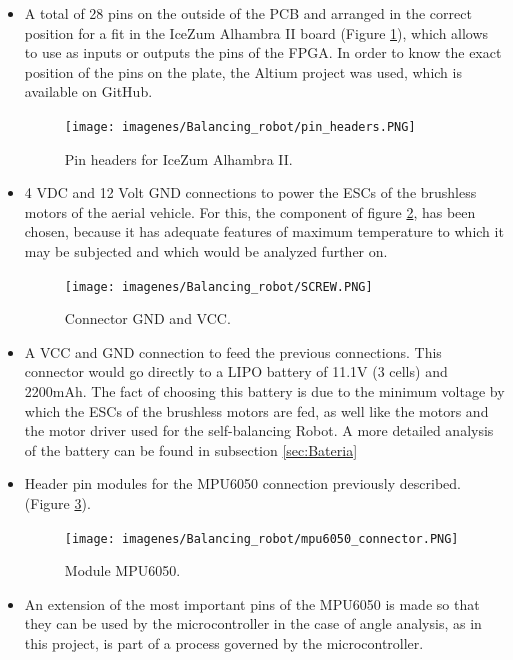 \begin{itemize}
	\item A total of 28 pins on the outside of the PCB and arranged in the correct position for a fit in the IceZum Alhambra II board (Figure \ref{fig:pin_headers}), which allows to use as inputs or outputs the pins of the FPGA. In order to know the exact position of the pins on the plate, the Altium project was used, which is available on GitHub.
	
	\begin{figure}[H]
		\center
		\texttt{[image: imagenes/Balancing\_robot/pin\_headers.PNG]}
		\caption{Pin headers for IceZum Alhambra II.}
		\label{fig:pin_headers}
	\end{figure}
	
	
	\item 4 VDC and 12 Volt GND connections to power the ESCs of the brushless motors of the aerial vehicle. For this, the component of figure \ref{fig:screw}, has been chosen, because it has adequate features of maximum temperature to which it may be subjected and which would be analyzed further on.
	
	\begin{figure}[H]
		\center
		\texttt{[image: imagenes/Balancing\_robot/SCREW.PNG]}
		\caption{Connector GND and VCC.}
		\label{fig:screw}
	\end{figure}
	
	
	\item A VCC and GND connection to feed the previous connections. This connector would go directly to a LIPO battery of 11.1V (3 cells) and 2200mAh. The fact of choosing this battery is due to the minimum voltage by which the ESCs of the brushless motors are fed, as well like the motors and the motor driver used for the self-balancing Robot. A more detailed analysis of the battery can be found in subsection \ref{sec:Bateria}
	
	\item Header pin modules for the MPU6050 connection previously described. (Figure \ref{fig:mpu6050_connector}).
		
		\begin{figure}[H]
			\center
			\texttt{[image: imagenes/Balancing\_robot/mpu6050\_connector.PNG]}
			\caption{Module MPU6050.}
			\label{fig:mpu6050_connector}
		\end{figure}
		
		\item An extension of the most important pins of the MPU6050 is made so that they can be used by the microcontroller in the case of angle analysis, as in this project, is part of a process governed by the microcontroller.
		

\end{itemize}
